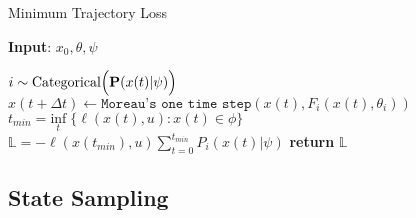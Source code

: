 \begin{enumerate}
    \begin{algorithm}[H]
        \caption{Minimum Trajectory Loss}
        \label{algo:mtl}
        \small
        \hspace*{\algorithmicindent} \textbf{Input}: $x_0, \theta, \psi$
        \begin{algorithmic}[1]
                    \State $i \sim \text{Categorical}\Bigl(\mathbf{P}(x(t)| \psi)\Bigr)$ 
                    \State $x(t + \Delta t) \leftarrow \texttt{Moreau's one time step}(x(t), F_i(x(t), \theta_i))$
                \EndFor
                \State $t_{min} = \underset{t}{\textrm{inf}} \; \{ \ell(x(t), u): x(t) \in \phi\}$
                \State $\mathbb{L} = - \ell(x(t_{min}), u) \sum_{t=0}^{t_{min}}P_i(x(t) | \psi)  $
            \State \textbf{return} $\mathbb{L}$
        \end{algorithmic}
    \end{algorithm}
\end{enumerate}

\subsection{State Sampling}
\label{ssec:state_sampling}


